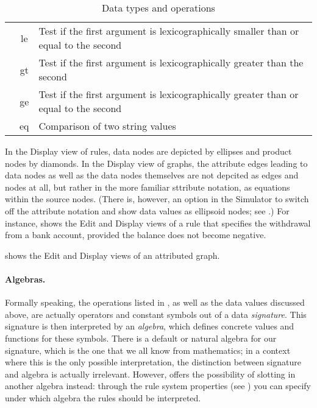 \begin{table}
\begin{center}
\begin{tabular}{|c|c|l|}
  & \sf le & Test if the first argument is
  lexicographically smaller than or equal to the second \\
  & \sf gt & Test if the first argument is
  lexicographically greater than the second \\
  & \sf ge &Test if the first argument is
  lexicographically greater than or equal to the second \\
  & \sf eq & Comparison of two string values \\
\hline\hline
\end{tabular}
\end{center}
\vspace*{-\medskipamount}
\caption{Data types and operations}
\vspace*{-\medskipamount}
\end{table}

In the Display view of rules, data nodes are depicted by ellipses and product
nodes by diamonds. In the Display view of graphs, the attribute edges leading
to data nodes as well as the data nodes themselves are not depcited as edges
and nodes at all, but rather in the more familiar sttribute notation, as
equations within the source nodes. (There is, however, an option in the
Simulator to switch off the attribute notation and show data values as
ellipsoid nodes; see .) For instance,
 shows the Edit and Display views of a rule that specifies
the withdrawal from a bank account, provided the balance does not
become negative.


 shows the Edit and Display views of an attributed graph.


\paragraph{Algebras.}

Formally speaking, the operations listed in , as well as the data
values discussed above, are actually operators and constant symbols out of a
data \emph{signature}. This signature is then interpreted by an \emph{algebra},
which defines concrete values and functions for these symbols. There is a
default or natural algebra for our signature, which is the one that we all know
from mathematics; in a context where this is the only possible interpretation,
the distinction between signature and algebra is actually irrelevant. However,
\Groove{} offers the possibility of slotting in another algebra instead:
through the rule system properties (see ) you can
specify under which algebra the rules should be interpreted.

